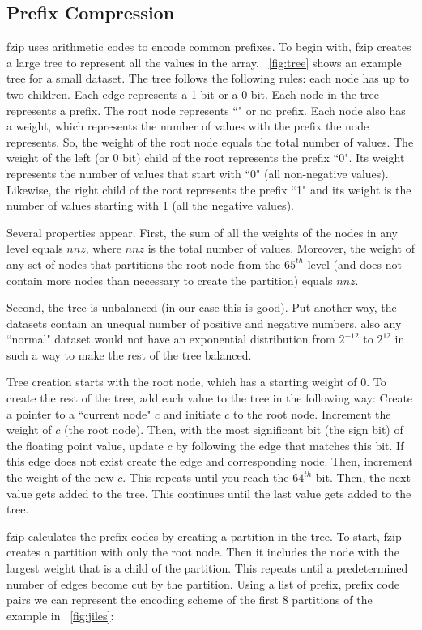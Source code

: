 \subsection{Prefix Compression}
fzip uses arithmetic codes to encode common prefixes. To begin with, fzip creates a large tree to represent all the values in the array. \figurename~\ref{fig:tree} shows an example tree for a small dataset. The tree follows the following rules: each node has up to two children. Each edge represents a 1 bit or a 0 bit. Each node in the tree represents a prefix. The root node represents ``" or no prefix. Each node also has a weight, which represents the number of values with the prefix the node represents. So, the weight of the root node equals the total number of values. The weight of the left (or 0 bit) child of the root represents the prefix ``0". Its weight represents the number of  values that start with ``0" (all non-negative values). Likewise, the right child of the root represents the prefix ``1" and its weight is the number of values starting with 1 (all the negative values).\par
Several properties appear. First, the sum of all the weights of the nodes in any level equals $nnz$, where $nnz$ is the total number of values. Moreover, the weight of any set of nodes that partitions the root node from the $65^{th}$ level (and does not contain more nodes than necessary to create the partition) equals $nnz$.\par
Second, the tree is unbalanced (in our case this is good). Put another way, the datasets contain an unequal number of positive and negative numbers, also any ``normal" dataset would not have an exponential distribution from $2^{-12}$ to $2^{12}$ in such a way to make the rest of the tree balanced.\par
Tree creation starts with the root node, which has a starting weight of 0. To create the rest of the tree, add each value to the tree in the following way: Create a pointer to a ``current node" $c$ and initiate $c$ to the root node. Increment the weight of $c$ (the root node). Then, with the most significant bit (the sign bit) of the floating point value, update $c$ by following the edge that matches this bit. If this edge does not exist create the edge and corresponding node. Then, increment the weight of the new $c$. This repeats until you reach the $64^{th}$ bit. Then, the next value gets added to the tree. This continues until the last value gets added to the tree.\par
fzip calculates the prefix codes by creating a partition in the tree. To start, fzip creates a partition with only the root node. Then it includes the node with the largest weight that is a child of the partition. This repeats until a predetermined number of edges become cut by the partition. Using a list of prefix, prefix code pairs we can represent the encoding scheme of the first 8 partitions of the example in \figurename~\ref{fig:jiles}:\par

